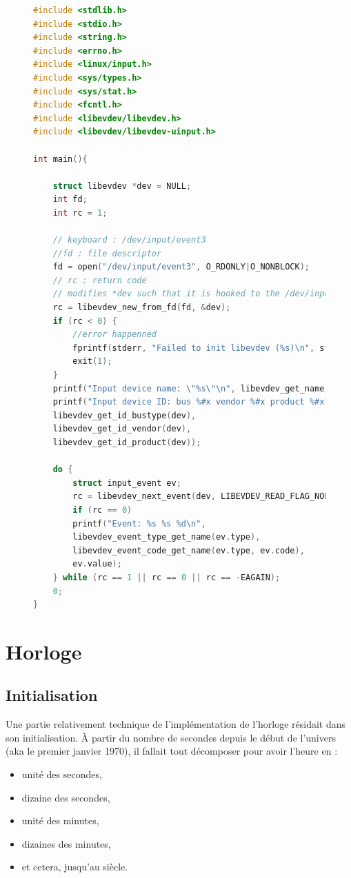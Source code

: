 \documentclass[10pt,a4paper,notitlepage ]{report}
\begin{document}
	
	\begin{figure}
	\begin{lstlisting}[language=C, frame=single, caption={Keylogger test}]
#include <stdlib.h>
#include <stdio.h>
#include <string.h>
#include <errno.h>
#include <linux/input.h>
#include <sys/types.h>
#include <sys/stat.h>
#include <fcntl.h>
#include <libevdev/libevdev.h>
#include <libevdev/libevdev-uinput.h>

int main(){
	
	struct libevdev *dev = NULL;
	int fd;
	int rc = 1;
	
	// keyboard : /dev/input/event3
	//fd : file descriptor
	fd = open("/dev/input/event3", O_RDONLY|O_NONBLOCK);
	// rc : return code
	// modifies *dev such that it is hooked to the /dev/input file
	rc = libevdev_new_from_fd(fd, &dev);
	if (rc < 0) {
		//error happenned
		fprintf(stderr, "Failed to init libevdev (%s)\n", strerror(-rc));
		exit(1);
	}
	printf("Input device name: \"%s\"\n", libevdev_get_name(dev));
	printf("Input device ID: bus %#x vendor %#x product %#x\n",
	libevdev_get_id_bustype(dev),
	libevdev_get_id_vendor(dev),
	libevdev_get_id_product(dev));
	
	do {
		struct input_event ev;
		rc = libevdev_next_event(dev, LIBEVDEV_READ_FLAG_NORMAL, &ev);
		if (rc == 0)
		printf("Event: %s %s %d\n",
		libevdev_event_type_get_name(ev.type),
		libevdev_event_code_get_name(ev.type, ev.code),
		ev.value);
	} while (rc == 1 || rc == 0 || rc == -EAGAIN);
	0;
}
	\end{lstlisting}
	\end{figure}

	\section{Horloge}

		\subsection{Initialisation}

			Une partie relativement technique de l'implémentation de l'horloge résidait dans son initialisation. À partir du nombre de secondes depuis le début de l'univers (aka le premier janvier 1970), il fallait tout décomposer pour avoir l'heure en :
			\begin{itemize}
				\item unité des secondes,
				\item dizaine des secondes,
				\item unité des minutes,
				\item dizaines des minutes,
				\item et cetera, jusqu'au siècle.
			\end{itemize}
\end{document}
